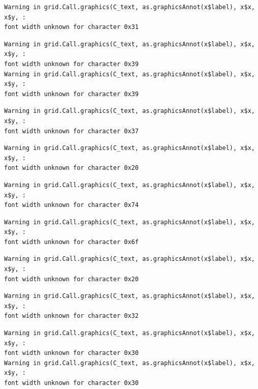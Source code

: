 \documentclass[
  letterpaper,
]{scrbook}
\begin{document}
\begin{verbatim}
Warning in grid.Call.graphics(C_text, as.graphicsAnnot(x$label), x$x, x$y, :
font width unknown for character 0x31
\end{verbatim}

\begin{verbatim}
Warning in grid.Call.graphics(C_text, as.graphicsAnnot(x$label), x$x, x$y, :
font width unknown for character 0x39
Warning in grid.Call.graphics(C_text, as.graphicsAnnot(x$label), x$x, x$y, :
font width unknown for character 0x39
\end{verbatim}

\begin{verbatim}
Warning in grid.Call.graphics(C_text, as.graphicsAnnot(x$label), x$x, x$y, :
font width unknown for character 0x37
\end{verbatim}

\begin{verbatim}
Warning in grid.Call.graphics(C_text, as.graphicsAnnot(x$label), x$x, x$y, :
font width unknown for character 0x20
\end{verbatim}

\begin{verbatim}
Warning in grid.Call.graphics(C_text, as.graphicsAnnot(x$label), x$x, x$y, :
font width unknown for character 0x74
\end{verbatim}

\begin{verbatim}
Warning in grid.Call.graphics(C_text, as.graphicsAnnot(x$label), x$x, x$y, :
font width unknown for character 0x6f
\end{verbatim}

\begin{verbatim}
Warning in grid.Call.graphics(C_text, as.graphicsAnnot(x$label), x$x, x$y, :
font width unknown for character 0x20
\end{verbatim}

\begin{verbatim}
Warning in grid.Call.graphics(C_text, as.graphicsAnnot(x$label), x$x, x$y, :
font width unknown for character 0x32
\end{verbatim}

\begin{verbatim}
Warning in grid.Call.graphics(C_text, as.graphicsAnnot(x$label), x$x, x$y, :
font width unknown for character 0x30
Warning in grid.Call.graphics(C_text, as.graphicsAnnot(x$label), x$x, x$y, :
font width unknown for character 0x30
\end{verbatim}
\end{document}
